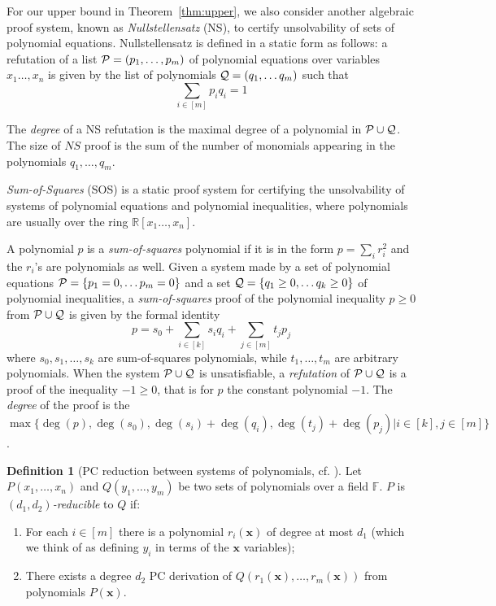 \documentclass[10pt,a4paper]{article}
\theoremstyle{definition}
\newtheorem{definition}[theorem]{Definition}
\begin{document}
For our upper bound in Theorem~\ref{thm:upper}, we also consider another algebraic proof system, known as {\em Nullstellensatz} (NS), to certify unsolvability of sets of polynomial equations. Nullstellensatz  is defined in a static form as follows:  a  refutation of a list  ${\cal P}=(p_1,\ldots,p_m)$ of polynomial equations over variables $x_1\ldots,x_n$ 
is given by the list of polynomials  ${\cal Q}=(q_1,\ldots q_m)$  such that
$$
\sum_{i \in [m]} p_iq_i =1
$$

The {\em degree} of a NS refutation is the maximal degree of a polynomial in ${\cal P} \cup {\cal Q}$. The size of $NS$ proof is the sum of the number of monomials appearing in the polynomials
$q_1,\ldots, q_m$.

\medskip

{\em Sum-of-Squares} (SOS) is a static proof system for certifying the unsolvability of systems of polynomial equations and polynomial inequalities, where polynomials are usually over the ring $\mathbb R[x_1\ldots, x_n]$.    

A polynomial $p$ is a {\em sum-of-squares} polynomial if it is in the form $p=\sum_{i} r_i^2$ and the $r_i$'s  are polynomials as well.  Given a system made by a set of polynomial equations  
 ${\cal P} =\{p_1=0,\ldots p_m=0\}$ and a set ${\cal Q}=\{q_1\geq 0,\ldots q_k\geq 0\}$ of polynomial inequalities, a {\em sum-of-squares} proof of the polynomial inequality $p\geq 0 $ from ${\cal P} \cup {\cal Q}$  is  given by the  formal identity
 $$
 p= s_0+\sum_{i\in [k]}s_iq_i + \sum_{j \in [m]}t_jp_j
 $$
where $s_0,s_1,\ldots, s_k$ are sum-of-squares polynomials, while $t_1,\ldots,t_m$ are arbitrary polynomials.  When the system  ${\cal P} \cup {\cal Q}$  is unsatisfiable, a {\em refutation} of ${\cal P} \cup {\cal Q}$ is a proof of the inequality $-1\geq 0$, that is for  $p$ the constant polynomial $-1$. The {\em degree} of the proof is 
the $\max \{\deg(p),\deg(s_0), \deg(s_i)+\deg(q_i), \deg(t_j)+\deg(p_j) | i \in [k], j \in[m]\}$.   


\medskip 

\begin{definition}[PC reduction between systems of polynomials, cf. {\cite[Sec.~3]{DBLP:journals/jcss/BussGIP01}}] \label{def:reduction}
Let $P(x_1,\ldots,x_n)$ and $Q(y_1,\ldots, y_m)$ be two sets of polynomials over a field $\mathbb F$.  
$P$ is \emph{$(d_1,d_2)$-reducible} to $Q$ if:
\begin{enumerate}
\item For each $i \in [m]$ there is a polynomial $r_i(\mathbf{x})$ of degree at most $d_1$  (which we think of as defining $y_i$ in terms of the $\mathbf x$ variables);
\item There exists a degree $d_2$ PC derivation of $Q(r_1(\mathbf x),\ldots, r_m(\mathbf x) )$ from polynomials $P(\mathbf x)$.
\end{enumerate}
\end{definition}
\end{document}
